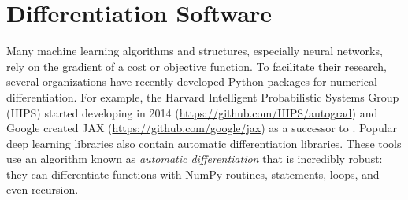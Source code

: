 \section*{Differentiation Software} %

Many machine learning algorithms and structures, especially neural networks, rely on the gradient of a cost or objective function.
To facilitate their research, several organizations have recently developed Python packages for numerical differentiation.
For example, the Harvard Intelligent Probabilistic Systems Group (HIPS) started developing  in 2014 (\url{https://github.com/HIPS/autograd}) and Google 
created JAX (\url{https://github.com/google/jax}) as a successor to .
Popular deep learning libraries also contain automatic differentiation libraries.
These tools use an algorithm known as \emph{automatic differentiation} that is incredibly robust: they can differentiate functions with NumPy routines,  statements,  loops, and even recursion.

